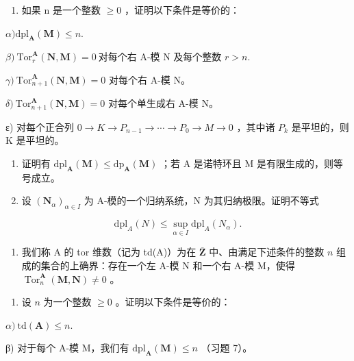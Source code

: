 \begin{enumerate}
\def\labelenumi{\alph{enumi})}
\tightlist
\item
  如果 n 是一个整数 \(\geqslant 0\) ，证明以下条件是等价的：
\end{enumerate}

\(\alpha)\mathrm{dpl}_{\mathbf{A}}(\mathbf{M})\leqslant n.\)

\(\beta)\ \mathrm{Tor}_{r}^{\mathbf{A}}(\mathbf{N},\mathbf{M})=0\ \text{对每个右 A-模 N 及每个整数 }r>n.\)

\(\gamma)\ \mathrm{Tor}_{n+1}^{\mathbf{A}}(\mathbf{N},\mathbf{M})=0\) 对每个右 A-模 N。

\(\delta)\ \mathrm{Tor}_{n+1}^{\mathbf{A}}(\mathbf{N},\mathbf{M})=0\) 对每个单生成右 A-模 N。

ε) 对每个正合列 \(0 \rightarrow K \rightarrow P_{n-1} \rightarrow \cdots \rightarrow P_{0} \rightarrow M \rightarrow 0\) ，其中诸 \(P_{k}\) 是平坦的，则 K 是平坦的。

\begin{enumerate}
\def\labelenumi{\alph{enumi})}
\setcounter{enumi}{1}
\item
  证明有 \(\mathrm{dpl}_{\mathbf{A}}(\mathbf{M}) \leqslant \mathrm{dp}_{\mathbf{A}}(\mathbf{M})\) ；若 A 是诺特环且 M 是有限生成的，则等号成立。
\item
  设 \((\mathbf{N}_{\alpha})_{\alpha \in I}\) 为 A-模的一个归纳系统，N 为其归纳极限。证明不等式
\end{enumerate}

\[
\mathrm{dpl} _ {A} (N) \leqslant \sup _ {\alpha \in I} \mathrm{dpl} _ {A} (N _ {\alpha}).
\]

\begin{enumerate}
\def\labelenumi{\arabic{enumi})}
\setcounter{enumi}{7}
\tightlist
\item
  我们称 A 的 tor 维数（记为 td(A)）为在 \(\overline{\mathbf{Z}}\) 中、由满足下述条件的整数 \(n\) 组成的集合的上确界：存在一个左 A-模 N 和一个右 A-模 M，使得 \(\operatorname{Tor}_{n}^{\mathbf{A}}(\mathbf{M},\mathbf{N})\neq0\) 。
\end{enumerate}

\begin{enumerate}
\def\labelenumi{\alph{enumi})}
\tightlist
\item
  设 \(n\) 为一个整数 \(\geqslant 0\) 。证明以下条件是等价的：
\end{enumerate}

\(\alpha)\ \mathrm{td}(\mathbf{A}) \leqslant n.\)

β) 对于每个 A-模 M，我们有 \(\mathrm{dpl}_{\mathbf{A}}(\mathbf{M}) \leqslant n\) （习题 7）。

